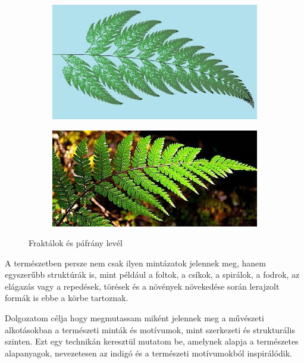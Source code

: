 \begin{figure}[h!]
	\centering
	\begin{subfigure}[b]{0.4\linewidth}
	  \includegraphics[width=\linewidth]{img/fraktal_01.jpg}
	  \caption{}
	\end{subfigure}
	\begin{subfigure}[b]{0.47\linewidth}
	  \includegraphics[width=\linewidth]{img/fraktal_02.jpg}
	  \caption{}
	\end{subfigure}
	\caption{Fraktálok és páfrány levél}
	\label{fig:fraktal}
  \end{figure}

A természetben persze nem csak ilyen mintázatok jelennek meg, hanem egyszerűbb struktúrák is, mint például a foltok, a csíkok, a spirálok, a fodrok, az elágazás vagy a repedések, törések és a növények növekedése során lerajzolt formák is ebbe a körbe tartoznak.

Dolgozatom célja hogy megmutassam miként jelennek meg a művészeti alkotásokban a természeti minták és motívumok, mint szerkezeti és strukturális szinten. Ezt egy technikán keresztül mutatom be, amelynek alapja a természetes alapanyagok, nevezetesen az indigó és a természeti motívumokból inspirálódik. 

